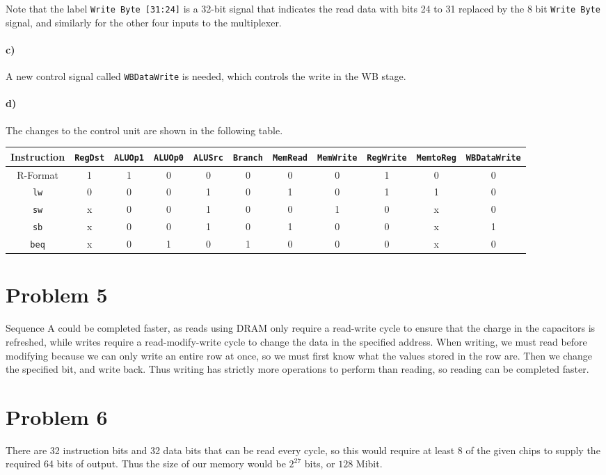 \documentclass[12pt]{article}
\begin{document}
Note that the label \texttt{Write Byte [31:24]} is a 32-bit signal that indicates the read data with bits 24 to 31 replaced by the 8 bit \texttt{Write Byte} signal, and
similarly for the other four inputs to the multiplexer.

\paragraph{c)}

A new control signal called \texttt{WBDataWrite} is needed, which controls the write in the WB stage.

\paragraph{d)}

The changes to the control unit are shown in the following table.
\begin{center}
       {\scriptsize
        \hspace*{-4cm}
        \begin{tabular}{c|c|c|c|c|c|c|c|c|c|c}
                Instruction & \texttt{RegDst} & \texttt{ALUOp1} & \texttt{ALUOp0} & \texttt{ALUSrc} & \texttt{Branch} & \texttt{MemRead}
                & \texttt{MemWrite} & \texttt{RegWrite} & \texttt{MemtoReg} & \texttt{WBDataWrite}\\
                \hline
                R-Format & 1 & 1 & 0 & 0 & 0 & 0 & 0 & 1 & 0 & 0\\
                \texttt{lw} & 0 & 0 & 0 & 1 & 0 & 1 & 0 & 1 & 1 & 0\\
                \texttt{sw} & x & 0 & 0 & 1 & 0 & 0 & 1 & 0 & x & 0\\
                \texttt{sb} & x & 0 & 0 & 1 & 0 & 1 & 0 & 0 & x & 1\\
                \texttt{beq} & x & 0 & 1 & 0 & 1 & 0 & 0 & 0 & x & 0
        \end{tabular}
        \hspace{-4cm}
        }
\end{center}

\section*{Problem 5}

Sequence A could be completed faster, as reads using DRAM only require a read-write cycle to ensure that the charge in the capacitors is refreshed,
while writes require a read-modify-write cycle to change the data in the specified address. When writing, we must read before modifying because we can only write
an entire row at once, so we must first know what the values stored in the row are. Then we change the specified bit, and write back. Thus writing has strictly more
operations to perform than reading, so reading can be completed faster.

\section*{Problem 6}

There are 32 instruction bits and 32 data bits that can be read every cycle, so this would require at least 8 of the given chips to supply the required 64 bits
of output. Thus the size of our memory would be \(2^{27}\) bits, or \(128\) Mibit.
\end{document}
